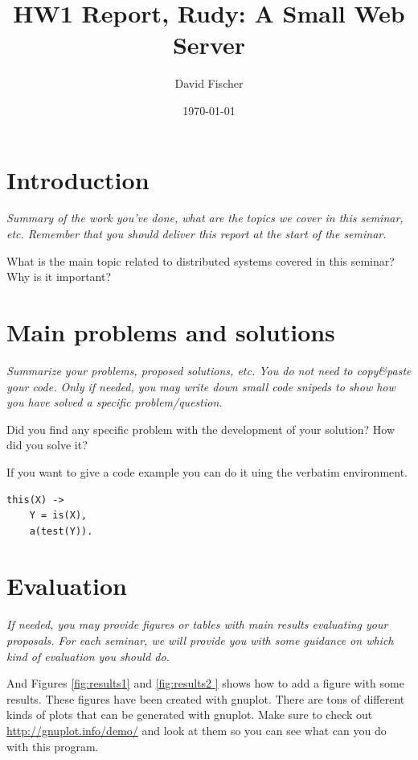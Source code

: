 \documentclass[a4paper, 11pt]{article}
\title{HW1 Report, Rudy: A Small Web Server}
\author{David Fischer}
\date{\today{}}
\begin{document}
\maketitle

\section{Introduction}

\textit{Summary of the work you've done, what are the topics we cover
  in this seminar, etc. Remember that you should deliver this report
  at the start of the seminar.}

What is the main topic related to distributed systems covered in this seminar?
Why is it important?

\section{Main problems and solutions}

\textit{Summarize your problems, proposed solutions, etc. You do not
  need to copy\&paste your code. Only if needed, you may write down
  small code snipeds to show how you have solved a specific
  problem/question.}

Did you find any specific problem with the development of your
solution?  How did you solve it?

If you want to give a code example you can do it uing the verbatim environment.
\begin{verbatim}
this(X) ->
    Y = is(X),
    a(test(Y)).
\end{verbatim}

\section{Evaluation}

\textit{If needed, you may provide figures or tables with main results
  evaluating your proposals. For each seminar, we will provide you
  with some guidance on which kind of evaluation you should do.}


And Figures \ref{fig:results1} and \ref{fig:results2 } shows how to
add a figure with some results. These figures have been created with
gnuplot. There are tons of different kinds of plots that can be
generated with gnuplot. Make sure to check out
\url{http://gnuplot.info/demo/} and look at them so you can see what
can you do with this program.
\end{document}
